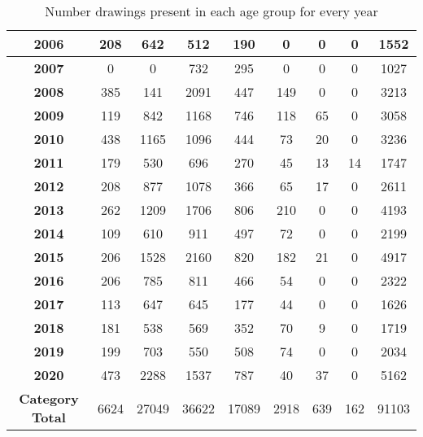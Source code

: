 \begin{table}
\begin{tabular}{|c|c|c|c|c|c|c|c|c|}
        \textbf{2006} & 208 & 642 & 512 & 190 & 0 & 0 & 0 & 1552 \\ \hline
        \textbf{2007} & 0 & 0 & 732 & 295 & 0 & 0 & 0 & 1027 \\ \hline
        \textbf{2008} & 385 & 141 & 2091 & 447 & 149 & 0 & 0 & 3213 \\ \hline
        \textbf{2009} & 119 & 842 & 1168 & 746 & 118 & 65 & 0 & 3058 \\ \hline
        \textbf{2010} & 438 & 1165 & 1096 & 444 & 73 & 20 & 0 & 3236 \\ \hline
        \textbf{2011} & 179 & 530 & 696 & 270 & 45 & 13 & 14 & 1747 \\ \hline
        \textbf{2012} & 208 & 877 & 1078 & 366 & 65 & 17 & 0 & 2611 \\ \hline
        \textbf{2013} & 262 & 1209 & 1706 & 806 & 210 & 0 & 0 & 4193 \\ \hline
        \textbf{2014} & 109 & 610 & 911 & 497 & 72 & 0 & 0 & 2199 \\ \hline
        \textbf{2015} & 206 & 1528 & 2160 & 820 & 182 & 21 & 0 & 4917 \\ \hline
        \textbf{2016} & 206 & 785 & 811 & 466 & 54 & 0 & 0 & 2322 \\ \hline
        \textbf{2017} & 113 & 647 & 645 & 177 & 44 & 0 & 0 & 1626 \\ \hline
        \textbf{2018} & 181 & 538 & 569 & 352 & 70 & 9 & 0 & 1719 \\ \hline
        \textbf{2019} & 199 & 703 & 550 & 508 & 74 & 0 & 0 & 2034 \\ \hline
        \textbf{2020} & 473 & 2288 & 1537 & 787 & 40 & 37 & 0 & 5162 \\ \hline
        \textbf{Category Total} & 6624 & 27049 & 36622 & 17089 & 2918 & 639 & 162 & 91103 \\ \hline
    \end{tabular}
    \caption{Number drawings present in each age group for every year}
    \label{tab:year-age-distribution}
\end{table}